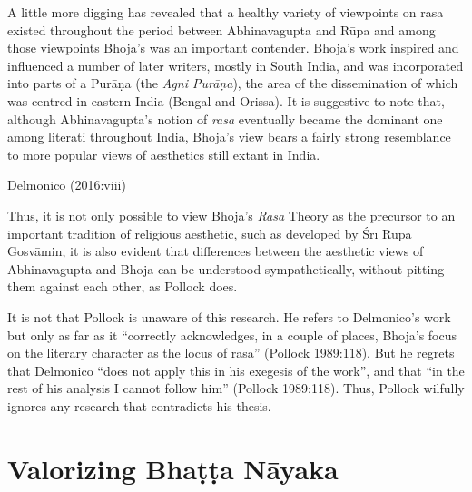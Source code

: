 \begin{myquote}
A little more digging has revealed that a healthy variety of viewpoints on rasa existed throughout the period between Abhinavagupta and Rūpa and among those viewpoints Bhoja's was an important contender. Bhoja's work inspired and influenced a number of later writers, mostly in South India, and was incorporated into parts of a Purāṇa (the \textsl{Agni Purāṇa}), the area of the dissemination of which was centred in eastern India (Bengal and Orissa). It is suggestive to note that, although Abhinavagupta's notion of \textsl{rasa} eventually became the dominant one among literati throughout India, Bhoja's view bears a fairly strong resemblance to more popular views of aesthetics still extant in India.

\hfill Delmonico (2016:viii)
\end{myquote}

Thus, it is not only possible to view Bhoja's \textsl{Rasa}
 Theory as the precursor to an important tradition of religious aesthetic, such as developed by Śrī Rūpa Gosvāmin, it is also evident that differences between the aesthetic views of Abhinavagupta and Bhoja can be understood sympathetically, without pitting them against each other, as Pollock does. 
 
It is not that Pollock is unaware of this research. He refers to Delmonico's work but only as far as it ``correctly acknowledges, in a couple of places, Bhoja's focus on the literary character as the locus of rasa'' (Pollock 1989:118). But he regrets that Delmonico ``does not apply this in his exegesis of the work'', and that ``in the rest of his analysis I cannot follow him'' (Pollock 1989:118). Thus, Pollock wilfully ignores any research that contradicts his thesis.

\section*{Valorizing Bhaṭṭa Nāyaka}

